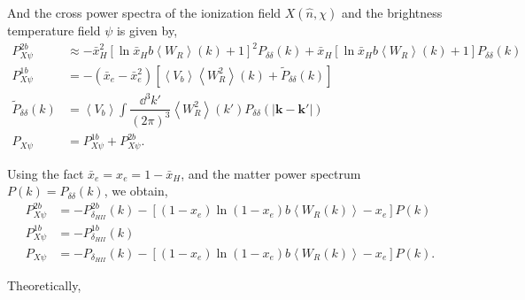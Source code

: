 And the cross power spectra of the ionization field $X(\hat{n}, \chi)$ and the brightness temperature field $\psi$ is given by,
\begin{align*}
  P_{X \psi}^{2b} &\approx -\bar{x}_H^2\left[\ln{\bar{x}_H} b \left<W_R\right>(k)+1\right]^2P_{\delta\delta}(k)+ \bar{x}_H\left[\ln{\bar{x}_H}b \left<W_R\right>(k)+1\right]P_{\delta\delta}(k)\\
  P_{X \psi}^{1b} &= -(\bar{x}_e - \bar{x}_e^2)\left[\left<V_b\right>\left<W_R^2\right>(k)+\tilde{P}_{\delta\delta}(k)\right]\\
  \tilde{P}_{\delta\delta}(k) &= \left<V_b\right>\int \dfrac{\dd^3 k'}{(2\pi)^3}\left<W_R^2\right>(k')P_{\delta\delta}(\left|\mathbf{k}-\mathbf{k}'\right|)\\
  P_{X \psi} &= P_{X \psi}^{1b}+P_{X \psi}^{2b}.
\end{align*}

Using the fact $\bar{x}_e = x_e = 1-\bar{x}_H$, and the matter power spectrum $P(k) = P_{\delta\delta}(k)$, we obtain,
\begin{align*}
  P_{X \psi}^{2b} &= -P^{2b}_{\delta_{HII}}(k)- \left[(1-x_e)\ln(1-x_e)b\left<W_R(k)\right>-x_e\right] P(k)\\
  P_{X \psi}^{1b} &= -P^{1b}_{\delta_{HII}}(k)\\
  P_{X \psi} &= -P_{\delta_{HII}}(k)- \left[(1-x_e)\ln(1-x_e)b\left<W_R(k)\right>-x_e\right]P(k).
\end{align*}

Theoretically,   